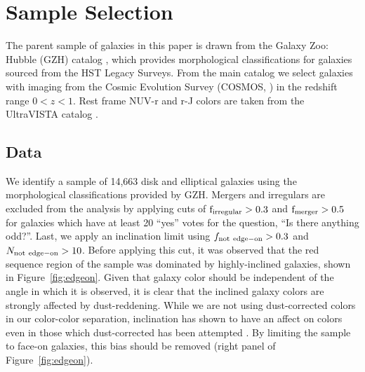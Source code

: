 \section{Sample Selection}
\label{sec:reddisksample}
The parent sample of galaxies in this paper is drawn from the Galaxy Zoo: Hubble (GZH) catalog \citep{Willett2016}, which provides morphological classifications for galaxies sourced from the HST Legacy Surveys. From the main catalog we select galaxies with imaging from the Cosmic Evolution Survey (COSMOS, \citet{Scoville2007}) in the redshift range $0<z<1$.  Rest frame NUV-r and r-J colors are taken from the UltraVISTA catalog \citep{McCracken2012,Ilbert2013}.

\subsection{Data}
\label{ssec:Data}
We identify a sample of 14,663 disk and elliptical galaxies using the morphological classifications provided by GZH. Mergers and irregulars are excluded from the analysis by applying cuts of $\rm f_{irregular} > 0.3$ and $\rm f_{merger} > 0.5$ for galaxies which have at least 20 ``yes'' votes for the question, ``Is there anything odd?''. Last, we apply an inclination limit using $f_{\rm not~edge-on} > 0.3$ and $N_{\rm not~edge-on}>10$. Before applying this cut, it was observed that the red sequence region of the sample was dominated by highly-inclined galaxies, shown in Figure~\ref{fig:edgeon}. Given that galaxy color should be independent of the angle in which it is observed, it is clear that the inclined galaxy colors are strongly affected by dust-reddening. While we are not using dust-corrected colors in our color-color separation, inclination has shown to have an affect on colors even in those which dust-corrected has been attempted \citep{Morselli2016a,Devour2017}. By limiting the sample to face-on galaxies, this bias should be removed (right panel of Figure~\ref{fig:edgeon}). 
 
